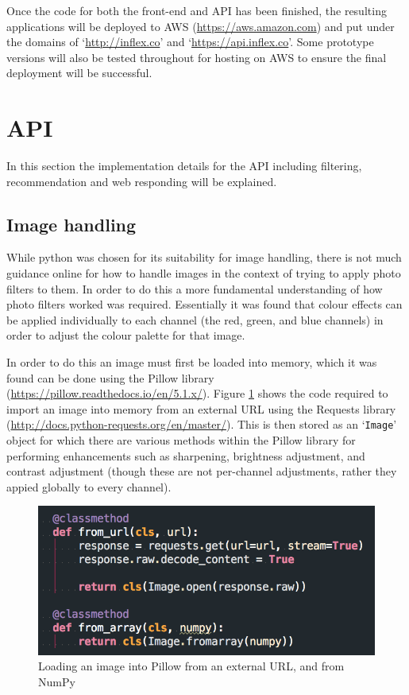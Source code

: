 \documentclass[a4paper,12pt]{report}
\begin{document}
  Once the code for both the front-end and API has been finished, the resulting applications will be deployed to AWS (\url{https://aws.amazon.com}) and put under the domains of ‘\url{http://inflex.co}’ and ‘\url{https://api.inflex.co}’. Some prototype versions will also be tested throughout for hosting on AWS to ensure the final deployment will be successful.

  \newpage
  \section{API}
    In this section the implementation details for the API including filtering, recommendation and web responding will be explained.

    \subsection{Image handling} \label{sec:numpy} \label{sec:pillow}
      While python was chosen for its suitability for image handling, there is not much guidance online for how to handle images in the context of trying to apply photo filters to them. In order to do this a more fundamental understanding of how photo filters worked was required. Essentially it was found that colour effects can be applied individually to each channel (the red, green, and blue channels) in order to adjust the colour palette for that image.

      In order to do this an image must first be loaded into memory, which it was found can be done using the Pillow library (\url{https://pillow.readthedocs.io/en/5.1.x/}). Figure \ref{fig:image-loading} shows the code required to import an image into memory from an external URL using the Requests library (\url{http://docs.python-requests.org/en/master/}). This is then stored as an ‘\texttt{Image}’ object for which there are various methods within the Pillow library for performing enhancements such as sharpening, brightness adjustment, and contrast adjustment (though these are not per-channel adjustments, rather they appied globally to every channel).

      \begin{figure}[h]
        \centering
        \includegraphics[width=0.5\linewidth]{image-loading}
        \caption{Loading an image into Pillow from an external URL, and from NumPy}
        \label{fig:image-loading}
      \end{figure}
\end{document}
